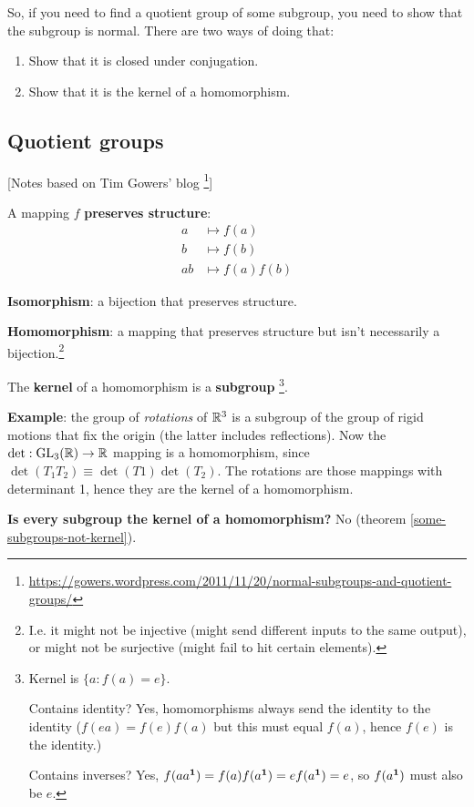 So, if you need to find a quotient group of some subgroup, you need to show
that the subgroup is normal. There are two ways of doing that:

\begin{enumerate}
\item Show that it is closed under conjugation.
\item Show that it is the kernel of a homomorphism.
\end{enumerate}

\subsection{Quotient groups}
[Notes based on Tim Gowers' blog \footnote{\url{https://gowers.wordpress.com/2011/11/20/normal-subgroups-and-quotient-groups/}}]

A mapping $f$ \textbf{preserves structure}:
\begin{align*}
  a  & \mapsto f(a)\\
  b  & \mapsto f(b)\\
  ab & \mapsto f(a)f(b)
\end{align*}

\textbf{Isomorphism}: a bijection that preserves structure.

\textbf{Homomorphism}: a mapping that preserves structure but isn't necessarily
a bijection.\footnote{I.e. it might not be injective (might send different
  inputs to the same output), or might not be surjective (might fail to hit
  certain elements).}

The \textbf{kernel} of a homomorphism is a \textbf{subgroup} \footnote{Kernel
  is $\{a:f(a) = e\}$.

Contains identity? Yes, homomorphisms always send the identity to the identity
($f(ea) = f(e)f(a)$ but this must equal $f(a)$, hence $f(e)$ is the identity.)

Contains inverses? Yes, $f(aa^{\mathbf 1}) = f(a)f(a^{\mathbf 1}) = ef(a^{\mathbf 1}) = e$, so $f(a^{\mathbf 1})$ must also be $e$.}.

\textbf{Example}: the group of \emph{rotations} of $\mathbb{R}^3$ is a subgroup of the
group of rigid motions that fix the origin (the latter includes
reflections). Now the $\det:\mathrm{GL}_{3}(\mathbb{R}) \to \mathbb{R}$ mapping is a homomorphism, since
$\det(T_1T_2) \equiv \det(T1)\det(T_2)$. The rotations are those mappings with
determinant 1, hence they are the kernel of a homomorphism.

\textbf{Is every subgroup the kernel of a homomorphism?} No (theorem
\ref{some-subgroups-not-kernel}).

